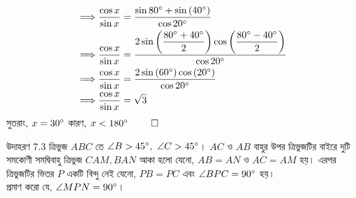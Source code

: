 \documentclass[12pt]{article}
\begin{document}
\begin{sol}
\begin{align*}
        \implies & \dfrac{\cos x}{\sin x} = \dfrac{\sin 80^\circ + \sin\left(40^\circ\right)}{\cos 20^\circ}\\
        \implies & \dfrac{\cos x}{\sin x} = \dfrac{2\sin \left( \dfrac{80^\circ + 40^\circ}{2} \right)\cos\left(\dfrac{80^\circ - 40^\circ}{2}\right)}{\cos 20^\circ}\\
        \implies & \dfrac{\cos x}{\sin x} = \dfrac{2\sin \left( 60^\circ \right)\cos\left(20^\circ\right)}{\cos 20^\circ}\\
        \implies & \dfrac{\cos x}{\sin x} =\sqrt 3\\
    \end{align*}
    সুতরাং, $x = 30^\circ$ কারণ, $x < 180\dg \ \qed$
\end{sol}

\begin{exam} {উদাহরণ 7.3}
    ত্রিভুজ $ABC$ তে $\angle B > 45^\circ, \ \angle C > 45^\circ$। $AC$ ও $AB$ বাহুর উপর ত্রিভুজটির 
    বাইরে দুটি সমকোণী সমদ্বিবাহু ত্রিভুজ $CAM, BAN$ আকা হলো যেনো, $AB=AN$ ও $AC = AM$ হয়। 
    এরপর ত্রিভুজটির ভিতর $P$ একটি বিন্দু নেই যেনো, $PB=PC$ এবং 
    $\angle BPC = 90^\circ$ হয়।\\
    প্রমাণ করো যে, $\angle MPN = 90^\circ$।
\end{exam}
\end{document}
